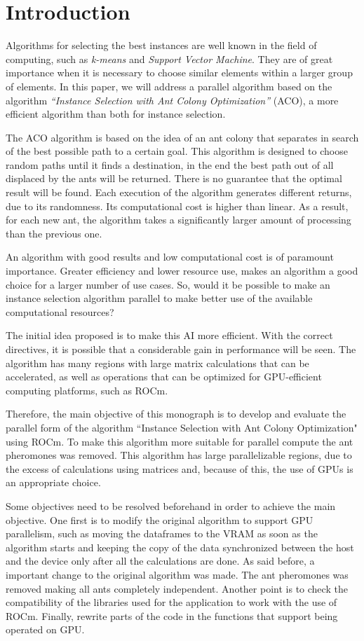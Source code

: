 \section{Introduction}

Algorithms for selecting the best instances are well known in the field of computing, such as \emph{k-means} and \emph{Support Vector Machine}. They are of great importance when it is necessary to choose similar elements within a larger group of elements. In this paper, we will address a parallel algorithm based on the algorithm \emph{``Instance Selection with Ant Colony Optimization''} (ACO), a more efficient algorithm than both for instance selection.

The ACO algorithm is based on the idea of an ant colony that separates in search of the best possible path to a certain goal. This algorithm is designed to choose random paths until it finds a destination, in the end the best path out of all displaced by the ants will be returned. There is no guarantee that the optimal result will be found. Each execution of the algorithm generates different returns, due to its randomness. Its computational cost is higher than linear. As a result, for each new ant, the algorithm takes a significantly larger amount of processing than the previous one.

An algorithm with good results and low computational cost is of paramount importance. Greater efficiency and lower resource use, makes an algorithm a good choice for a larger number of use cases. So, would it be possible to make an instance selection algorithm parallel to make better use of the available computational resources?

The initial idea proposed is to make this AI more efficient. With the correct directives, it is possible that a considerable gain in performance will be seen. The algorithm has many regions with large matrix calculations that can be accelerated, as well as operations that can be optimized for GPU-efficient computing platforms, such as ROCm.

Therefore, the main objective of this monograph is to develop and evaluate the parallel form of the algorithm ``Instance Selection with Ant Colony Optimization" using ROCm. To make this algorithm more suitable for parallel compute the ant pheromones was removed.
This algorithm has large parallelizable regions, due to the excess of calculations using matrices and, because of this, the use of GPUs is an appropriate choice.

Some objectives need to be resolved beforehand in order to achieve the main objective. One first is to modify the original algorithm to support GPU parallelism, such as moving the dataframes to the VRAM as soon as the algorithm starts and keeping the copy of the data synchronized between the host and the device only after all the calculations are done.
As said before, a important change to the original algorithm was made. The ant pheromones was removed making all ants completely independent.
Another point is to check the compatibility of the libraries used for the application to work with the use of ROCm. Finally, rewrite parts of the code in the functions that support being operated on GPU.

